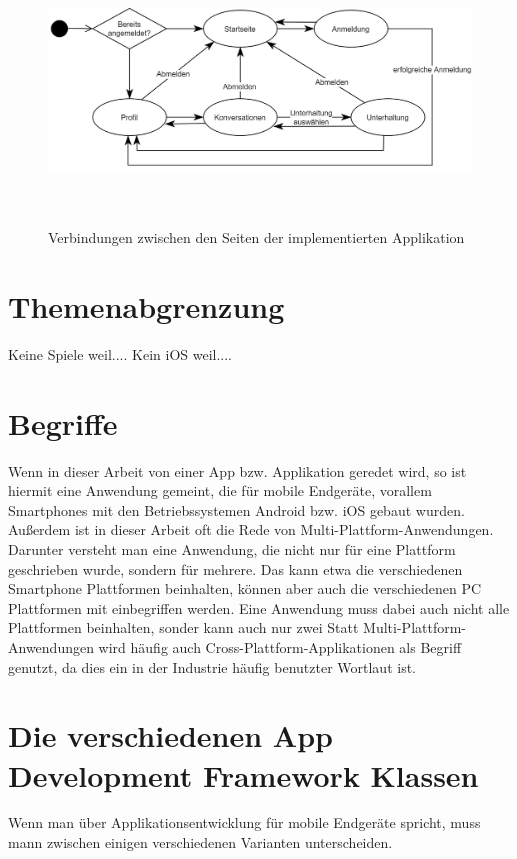 \begin{figure}[ht]
  \centering
  \includegraphics[height=7cm,keepaspectratio]{images/Pageflow_native_flutter.png} 
  \caption{Verbindungen zwischen den Seiten der implementierten Applikation }
  \label{fig:pageflow}
\end{figure}

\section{Themenabgrenzung}
Keine Spiele weil....
Kein iOS weil....


\section{Begriffe}
Wenn in dieser Arbeit von einer App bzw. Applikation geredet wird, so ist hiermit eine Anwendung gemeint, die für mobile Endgeräte, vorallem Smartphones mit den Betriebssystemen Android bzw. iOS gebaut wurden.
Außerdem ist in dieser Arbeit oft die Rede von Multi-Plattform-Anwendungen. Darunter versteht man eine Anwendung, die nicht nur für eine Plattform geschrieben wurde, sondern für mehrere. Das kann etwa die verschiedenen Smartphone Plattformen beinhalten, können aber auch die verschiedenen PC Plattformen mit einbegriffen werden. Eine Anwendung muss dabei auch nicht alle Plattformen beinhalten, sonder kann auch nur zwei Statt Multi-Plattform-Anwendungen wird häufig auch Cross-Plattform-Applikationen als Begriff genutzt, da dies ein in der Industrie häufig benutzter Wortlaut ist. 

\section{Die verschiedenen App Development Framework Klassen}
Wenn man über Applikationsentwicklung für mobile Endgeräte spricht, muss mann zwischen einigen verschiedenen Varianten unterscheiden.
